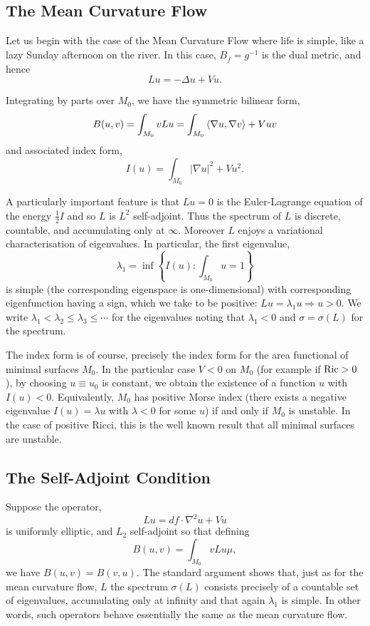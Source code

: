 \documentclass{amsart}
\begin{document}
\subsection{The Mean Curvature Flow}
\label{subsec:linearisation_mcf}

Let us begin with the case of the Mean Curvature Flow where life is simple, like a lazy Sunday afternoon on the river. In this case, \(B_{\dot{f}} = g^{-1}\) is the dual metric, and hence
\[
L u = -\Delta u + V u.
\]

Integrating by parts over \(M_0\), we have the symmetric bilinear form,
\[
B(u, v) = \int_{M_0} v Lu = \int_{M_0} \left\langle \nabla u,\nabla v \right\rangle + V uv 
\]
and associated index form,
\[
I(u) = \int_{M_0} |\nabla u|^2 + V u^2.
\]

A particularly important feature is that $L u = 0$ is the Euler-Lagrange equation of the energy \(\tfrac{1}{2} I\) and so \(L\) is $L^2$ self-adjoint. Thus the spectrum of \(L\) is discrete, countable, and accumulating only at \(\infty\). Moreover \(L\) enjoys a variational characterisation of eigenvalues. In particular, the first eigenvalue,
\[
\lambda_1 = \inf \left\{I(u) : \int_{M_0} u = 1\right\}
\]
is simple (the corresponding eigenspace is one-dimensional) with corresponding eigenfunction having a sign, which we take to be positive: \(Lu = \lambda_1 u \Rightarrow u > 0\). We write \(\lambda_1 < \lambda_2 \leq \lambda_3 \leq \cdots\) for the eigenvalues noting that \(\lambda_1 < 0\) and \(\sigma = \sigma(L)\) for the spectrum.

The index form is of course, precisely the index form for the area functional of minimal surfaces \(M_0\). In the particular case \(V < 0\) on \(M_0\) (for example if \(\operatorname{Ric} > 0\)), by choosing \(u \equiv u_0\) is constant, we obtain the existence of a function \(u\) with \(I(u) < 0\). Equivalently, \(M_0\) has positive Morse index (there exists a negative eigenvalue \(I(u) = \lambda u\) with \(\lambda < 0\) for some \(u\)) if and only if \(M_0\) is unstable. In the case of positive Ricci, this is the well known result that all minimal surfaces are unstable.

\subsection{The Self-Adjoint Condition}
\label{subsec:linearisation_selfadjoint}

Suppose the operator,
\[
L u = df \cdot \nabla^2 u + V u
\]
is uniformly elliptic, and \(L_2\) self-adjoint so that defining
\[
B(u, v) = \int_{M_0} v Lu \mu,
\]
we have \(B(u, v) = B(v, u)\). The standard argument \cite[Section 8.12]{GilbargTrudinger:/2001} shows that, just as for the mean curvature flow, \(L\) the spectrum \(\sigma(L)\) consists precisely of a countable set of eigenvalues, accumulating only at infinity and that again \(\lambda_1\) is simple. In other words, such operators behave essentially the same as the mean curvature flow.
\end{document}
